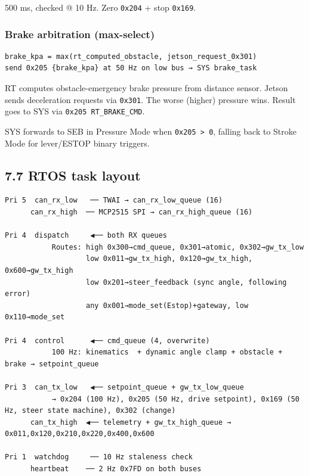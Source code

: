 500 ms, checked @ 10 Hz. Zero \texttt{0x204} + stop \texttt{0x169}.

\subsubsection{Brake arbitration
(max-select)}\label{brake-arbitration-max-select}

\begin{verbatim}
brake_kpa = max(rt_computed_obstacle, jetson_request_0x301)
send 0x205 {brake_kpa} at 50 Hz on low bus → SYS brake_task
\end{verbatim}

RT computes obstacle-emergency brake pressure from distance sensor. Jetson sends
deceleration requests via \texttt{0x301}. The worse (higher) pressure wins.
Result goes to SYS via \texttt{0x205\ RT\_BRAKE\_CMD}.

SYS forwards to SEB in Pressure Mode when \texttt{0x205\ \textgreater{}\ 0},
falling back to Stroke Mode for lever/ESTOP binary triggers.

\subsection{7.7 RTOS task layout}\label{rtos-task-layout}

\begin{verbatim}
Pri 5  can_rx_low   ── TWAI → can_rx_low_queue (16)
      can_rx_high  ── MCP2515 SPI → can_rx_high_queue (16)

Pri 4  dispatch     ◀── both RX queues
           Routes: high 0x300→cmd_queue, 0x301→atomic, 0x302→gw_tx_low
                   low 0x011→gw_tx_high, 0x120→gw_tx_high, 0x600→gw_tx_high
                   low 0x201→steer_feedback (sync angle, following error)
                   any 0x001→mode_set(Estop)+gateway, low 0x110→mode_set

Pri 4  control      ◀── cmd_queue (4, overwrite)
           100 Hz: kinematics  + dynamic angle clamp + obstacle + brake → setpoint_queue

Pri 3  can_tx_low   ◀── setpoint_queue + gw_tx_low_queue
           → 0x204 (100 Hz), 0x205 (50 Hz, drive setpoint), 0x169 (50 Hz, steer state machine), 0x302 (change)
      can_tx_high  ◀── telemetry + gw_tx_high_queue → 0x011,0x120,0x210,0x220,0x400,0x600

Pri 1  watchdog     ── 10 Hz staleness check
      heartbeat    ── 2 Hz 0x7FD on both buses
\end{verbatim}


